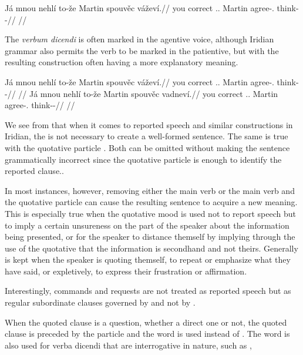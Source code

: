 \pex
\begingl
  \gla Já mnou nehlí to-že Martin spouvěc vážev\'i.//
  \glb you correct \Cop{}.\Sbj{}.\Quot{} \Qp{} Martin agree-\Cv{}.\Ipf{} think-\Av{}-\Cont{}//
  \glft {}//
\endgl
\xe

The \emph{verbum dicendi} is often marked in the agentive voice, although Iridian grammar also permits the verb to be marked in the patientive, but with the resulting construction often having a more explanatory meaning.

\pex
\a
\begingl
  \gla Já mnou nehlí to-že Martin spouvěc vážev\'i.//
  \glb you correct \Cop{}.\Sbj{}.\Quot{} \Qp{} Martin agree-\Cv{}.\Ipf{} think-\Av{}-\Cont{}//
  \glft {}//
\endgl
\a
\begingl
  \gla Já mnou nehlí to-že Martin spouvěc vadnev\'i.//
  \glb you correct \Cop{}.\Sbj{}.\Quot{} \Qp{} Martin agree-\Cv{}.\Ipf{} think-\Pv{}-\Cont{}//
  \glft {}//
\endgl
\xe



We see from  that when it comes to reported speech and similar constructions in Iridian, the  is not necessary to create a well-formed sentence. The same is true with the quotative particle . Both can be omitted without making the sentence grammatically incorrect since the quotative particle is enough to identify the reported clause..

In most instances, however, removing either the main verb or the main verb and the quotative particle can cause the resulting sentence to acquire a new meaning. This is especially true when the quotative mood is used not to report speech but to imply a certain unsureness on the part of the speaker about the information being presented, or for the speaker to distance themself by implying through the use of the quotative that the information is secondhand and not theirs. Generally  is kept when the speaker is quoting themself, to repeat or emphasize what they have said, or expletively, to express their frustration or affirmation.

Interestingly, commands and requests are not treated as reported speech but as regular subordinate clauses governed by  and not by .

When the quoted clause is a question, whether a direct one or not, the quoted clause is preceded by the particle  and the word  is used instead of . The word  is also used for verba dicendi that are interrogative in nature, such as ,

